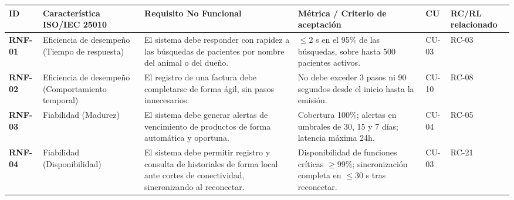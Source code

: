 \documentclass[
]{article}
\newcounter{none} %
\begin{document}
{\def\LTcaptype{none} %
\begin{longtable}[]{|
  >{\raggedright\arraybackslash}p{}|
  >{\raggedright\arraybackslash}p{}|
  >{\raggedright\arraybackslash}p{}|
  >{\raggedright\arraybackslash}p{}|
  >{\raggedright\arraybackslash}p{}|
  >{\raggedright\arraybackslash}p{}|}
\hline
\begin{minipage}[b]{\linewidth}\raggedright
\textbf{ID}
\end{minipage} & \begin{minipage}[b]{\linewidth}\raggedright
\textbf{Característica ISO/IEC 25010}
\end{minipage} & \begin{minipage}[b]{\linewidth}\raggedright
\textbf{Requisito No Funcional}
\end{minipage} & \begin{minipage}[b]{\linewidth}\raggedright
\textbf{Métrica / Criterio de aceptación}
\end{minipage} & \begin{minipage}[b]{\linewidth}\raggedright
\textbf{CU}
\end{minipage} & \begin{minipage}[b]{\linewidth}\raggedright
\textbf{RC/RL relacionado}
\end{minipage} \\
\hline
\endhead
\hline
\endlastfoot
\textbf{RNF-01} & Eficiencia de desempeño (Tiempo de respuesta) & El sistema debe responder con rapidez a las búsquedas de pacientes por nombre del animal o del dueño. & $\leq$2 s en el 95\% de las búsquedas, sobre hasta 500 pacientes activos. & CU-03 & RC-03 \\
\hline
\textbf{RNF-02} & Eficiencia de desempeño (Comportamiento temporal) & El registro de una factura debe completarse de forma ágil, sin pasos innecesarios. & No debe exceder 3 pasos ni 90 segundos desde el inicio hasta la emisión. & CU-10 & RC-08 \\
\hline
\textbf{RNF-03} & Fiabilidad (Madurez) & El sistema debe generar alertas de vencimiento de productos de forma automática y oportuna. & Cobertura 100\%; alertas en umbrales de 30, 15 y 7 días; latencia máxima 24h. & CU-04 & RC-05 \\
\hline
\textbf{RNF-04} & Fiabilidad (Disponibilidad) & El sistema debe permitir registro y consulta de historiales de forma local ante cortes de conectividad, sincronizando al reconectar. & Disponibilidad de funciones críticas $\geq$99\%; sincronización completa en $\leq$30 s tras reconectar. & CU-03 & RC-21 \\

\end{longtable}}
\end{document}
